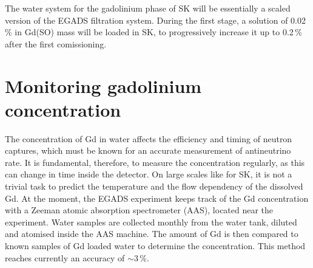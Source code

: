 The water system for the gadolinium phase of SK will be essentially a scaled version of the EGADS filtration system.
During the first stage, a solution of 0.02\,\% in Gd(SO) mass will be loaded in SK, %
to progressively increase it up to 0.2\,\% after the first comissioning.

\section{Monitoring gadolinium concentration}
\label{sec:gad}

The concentration of Gd in water affects the efficiency and timing of neutron captures, %
which must be known for an accurate measurement of antineutrino rate.
It is fundamental, therefore, to measure the concentration regularly, as this can change in time inside the detector.
On large scales like for SK, it is not a trivial task to predict the temperature and the flow dependency %
of the dissolved Gd.
At the moment, the EGADS experiment keeps track of the Gd concentration with a Zeeman atomic absorption spectrometer (AAS), %
located near the experiment.
Water samples are collected monthly from the water tank, diluted and atomised inside the AAS machine.
The amount of Gd is then compared to known samples of Gd loaded water to determine the concentration.
This method reaches currently an accuracy of $\sim3$\,\%.


